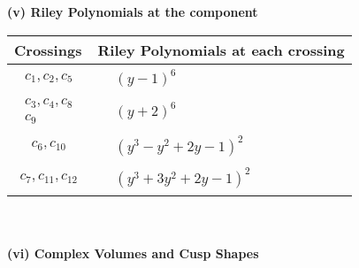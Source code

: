\documentclass[1p]{elsarticle_modified}
\theoremstyle{definition}
\begin{document}
\newpage\renewcommand{\arraystretch}{1}
\flushleft \textbf{(v) Riley Polynomials at the component}\newline \\
\begin{tabular}{m{50pt}|m{274pt}}
Crossings & \hspace{64pt}Riley Polynomials at each crossing \\
\hline $$\begin{aligned}c_{1},c_{2},c_{5}\end{aligned}$$&$\begin{aligned}
&(y-1)^6
\end{aligned}$\\
\hline $$\begin{aligned}c_{3},c_{4},c_{8}\\c_{9}\end{aligned}$$&$\begin{aligned}
&(y+2)^6
\end{aligned}$\\
\hline $$\begin{aligned}c_{6},c_{10}\end{aligned}$$&$\begin{aligned}
&(y^3- y^2+2 y-1)^2
\end{aligned}$\\
\hline $$\begin{aligned}c_{7},c_{11},c_{12}\end{aligned}$$&$\begin{aligned}
&(y^3+3 y^2+2 y-1)^2
\end{aligned}$\\
\hline
\end{tabular}\\~\\
\newpage\flushleft \textbf{(vi) Complex Volumes and Cusp Shapes}
\end{document}
